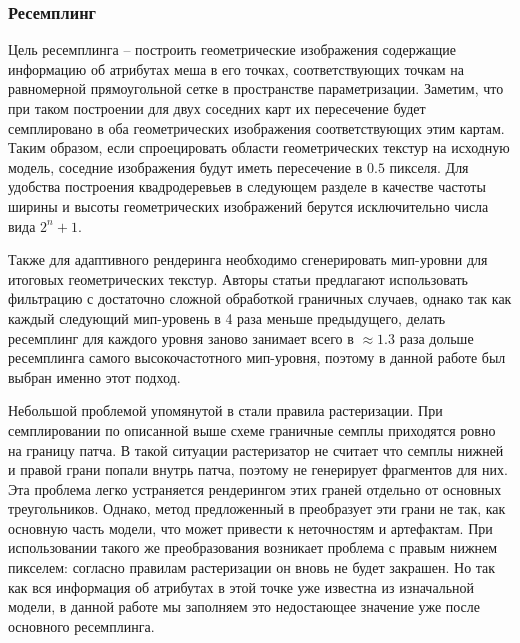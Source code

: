 \subsubsection{Ресемплинг}
Цель ресемплинга -- построить геометрические изображения содержащие информацию об атрибутах меша в его точках, соответствующих точкам на равномерной прямоугольной сетке в пространстве параметризации. Заметим, что при таком построении для двух соседних карт их пересечение будет семплировано в оба геометрических изображения соответствующих этим картам. Таким образом, если спроецировать области геометрических текстур на исходную модель, соседние изображения будут иметь пересечение в $0.5$ пикселя. Для удобства построения квадродеревьев в следующем разделе в качестве частоты ширины и высоты геометрических изображений берутся исключительно числа вида $2^n + 1$.

Также для адаптивного рендеринга необходимо сгенерировать мип-уровни для итоговых геометрических текстур. Авторы статьи \cite{purnomo2004} предлагают использовать фильтрацию с достаточно сложной обработкой граничных случаев, однако так как каждый следующий мип-уровень в 4 раза меньше предыдущего, делать ресемплинг для каждого уровня заново занимает всего в $\approx1.3$ раза дольше ресемплинга самого высокочастотного мип-уровня, поэтому в данной работе был выбран именно этот подход.

Небольшой проблемой упомянутой в \cite{niski2007multi} стали правила растеризации. При семплировании по описанной выше схеме граничные семплы приходятся ровно на границу патча. В такой ситуации растеризатор не считает что семплы нижней и правой грани попали внутрь патча, поэтому не генерирует фрагментов для них. Эта проблема легко устраняется рендерингом этих граней отдельно от основных треугольников. Однако, метод предложенный в \cite{niski2007multi} преобразует эти грани не так, как основную часть модели, что может привести к неточностям и артефактам. При использовании такого же преобразования возникает проблема с правым нижнем пикселем: согласно правилам растеризации он вновь не будет закрашен. Но так как вся информация об атрибутах в этой точке уже известна из изначальной модели, в данной работе мы заполняем это недостающее значение уже после основного ресемплинга.


